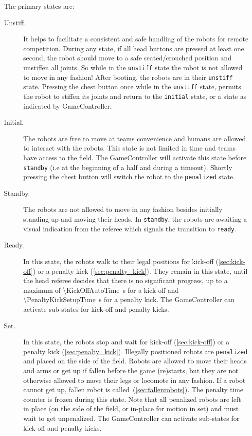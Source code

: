 The primary states are:
\begin{description}
  \item[Unstiff.] It helps to facilitate a consistent and safe handling of the robots for remote competition.
    During any state, if all head buttons are pressed at least one second, the robot should move to a safe seated/crouched position and unstiffen all joints.
    So while in the \texttt{unstiff} state the robot is not allowed to move in any fashion! After booting, the robots are in their \texttt{unstiff} state.
    Pressing the chest button once while in the \texttt{unstiff} state, permits the robot to stiffen its joints and return to the \texttt{initial} state, or a state as indicated by GameController.

    \item[Initial.] The robots are free to move at teams convenience and humans are allowed to interact with the robots. 
    This state is not limited in time and teams have access to the field.
    The GameController will activate this state before \texttt{standby} (i.e at the beginning of a half and during a timeout).
    Shortly pressing the chest button will switch the robot to the \texttt{penalized} state.

    \item[Standby.] The robots are not allowed to move in any fashion besides initially standing up and moving their heads.
    In \texttt{standby}, the robots are awaiting a visual indication from the referee which signals the transition to \texttt{ready}.

  \item[Ready.] In this state, the robots walk to their legal positions for kick-off (\cf \cref{sec:kick-off}) or a penalty kick (\cf \cref{sec:penalty_kick}).
    They remain in this state, until the head referee decides that there is no significant progress, up to a maximum of \qty{\KickOffAutoTime}{\second} for a kick-off and \qty{\PenaltyKickSetupTime}{\second} for a penalty kick.
    The GameController can activate sub-states for kick-off and penalty kicks.

  \item[Set.] In this state, the robots stop and wait for kick-off (\cf \cref{sec:kick-off}) or a penalty kick (\cf \cref{sec:penalty_kick}).
    Illegally positioned robots are \texttt{penalized} and placed on the side of the field.
    Robots are allowed to move their heads and arms or get up if fallen before the game (re)starts, but they are not otherwise allowed to move their legs or locomote in any fashion.
    If a robot cannot get up, fallen robot is called~(\cf \cref{sec:fallenrobots}).
    The penalty time counter is frozen during this state.
    Note that all penalized robots are left in place (on the side of the field, or in-place for motion in set) and must wait to get unpenalized.
    The GameController can activate sub-states for kick-off and penalty kicks.


\end{description}
